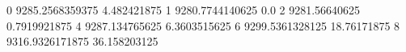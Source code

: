 0 9285.2568359375 4.482421875
1 9280.7744140625 0.0
2 9281.56640625 0.7919921875
4 9287.134765625 6.3603515625
6 9299.5361328125 18.76171875
8 9316.9326171875 36.158203125
